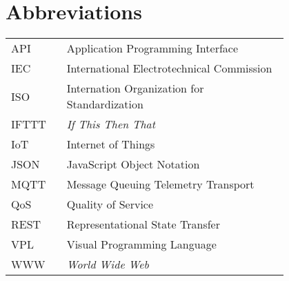 \chapter*{Abbreviations}


\begin{flushleft}
\begin{tabular}{l p{0.8\linewidth}}
API      & Application Programming Interface\\
IEC      & International Electrotechnical Commission\\
ISO      & Internation Organization for Standardization\\
IFTTT    & \textit{If This Then That}\\
IoT      & Internet of Things\\
JSON     & JavaScript Object Notation\\
MQTT     & Message Queuing Telemetry Transport\\
QoS      & Quality of Service\\
REST     & Representational State Transfer\\
VPL      & Visual Programming Language\\
WWW      & \textit{World Wide Web}\\
\end{tabular}
\end{flushleft}

